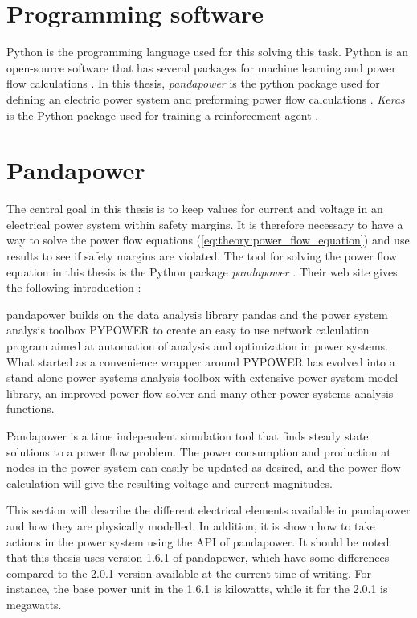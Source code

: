 \documentclass[class=book, crop=false]{standalone}
\begin{document}
\section{Programming software}
Python is the programming language used for this solving this task. Python is an open-source software that has several packages for machine learning and power flow calculations \cite{python_web}. In this thesis, \textit{pandapower} is the python package used for defining an electric power system and preforming power flow calculations \cite{pandapower}. \textit{Keras} is the Python package used for training a reinforcement agent \cite{keras_chollet2015}.

\section{Pandapower}
The central goal in this thesis is to keep values for current and voltage in an electrical power system within safety margins. It is therefore necessary to have a way to solve the power flow equations (\eqref{eq:theory:power_flow_equation}) and use results to see if safety margins are violated. The tool for solving the power flow equation in this thesis is the Python package \textit{pandapower} \cite{pandapower}. Their web site gives the following introduction \cite{pandapower_website}:

\begin{displayquote}
pandapower builds on the data analysis library pandas and the power system analysis toolbox PYPOWER to create an easy to use network calculation program aimed at automation of analysis and optimization in power systems. What started as a convenience wrapper around PYPOWER has evolved into a stand-alone power systems analysis toolbox with extensive power system model library, an improved power flow solver and many other power systems analysis functions.
\end{displayquote}

Pandapower is a time independent simulation tool that finds steady state solutions to a power flow problem. The power consumption and production at nodes in the power system can easily be updated as desired, and the power flow calculation will give the resulting voltage and current magnitudes.

This section will describe the different electrical elements available in pandapower and how they are physically modelled. In addition, it is shown how to take actions in the power system using the API of pandapower. It should be noted that this thesis uses version 1.6.1 of pandapower, which have some differences compared to the 2.0.1 version available at the current time of writing. For instance, the base power unit in the 1.6.1 is kilowatts, while it for the 2.0.1 is megawatts.
\end{document}
